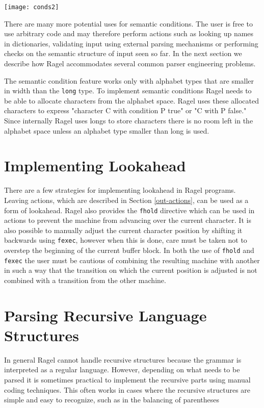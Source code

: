 \documentclass[letterpaper,11pt,oneside]{book}
\newcommand{\graphspace}{\vspace{10pt}}
\begin{document}
\begin{center}
\texttt{[image: conds2]}
\end{center}
\graphspace

There are many more potential uses for semantic conditions. The user is free to
use arbitrary code and may therefore perform actions such as looking up names
in dictionaries, validating input using external parsing mechanisms or
performing checks on the semantic structure of input seen so far. In the
next section we describe how Ragel accommodates several common parser
engineering problems.

\vspace{10pt}

 The semantic condition feature works only with
alphabet types that are smaller in width than the \verb|long| type. To
implement semantic conditions Ragel needs to be able to allocate characters
from the alphabet space. Ragel uses these allocated characters to express
"character C with condition P true" or "C with P false." Since internally Ragel
uses longs to store characters there is no room left in the alphabet space
unless an alphabet type smaller than long is used.

\section{Implementing Lookahead}

There are a few strategies for implementing lookahead in Ragel programs.
Leaving actions, which are described in Section \ref{out-actions}, can be
used as a form of lookahead.  Ragel also provides the \verb|fhold| directive
which can be used in actions to prevent the machine from advancing over the
current character. It is also possible to manually adjust the current character
position by shifting it backwards using \verb|fexec|, however when this is
done, care must be taken not to overstep the beginning of the current buffer
block. In both the use of \verb|fhold| and \verb|fexec| the user must be
cautious of combining the resulting machine with another in such a way that the
transition on which the current position is adjusted is not combined with a
transition from the other machine.

\section{Parsing Recursive Language Structures}

In general Ragel cannot handle recursive structures because the grammar is
interpreted as a regular language. However, depending on what needs to be
parsed it is sometimes practical to implement the recursive parts using manual
coding techniques. This often works in cases where the recursive structures are
simple and easy to recognize, such as in the balancing of parentheses
\end{document}
